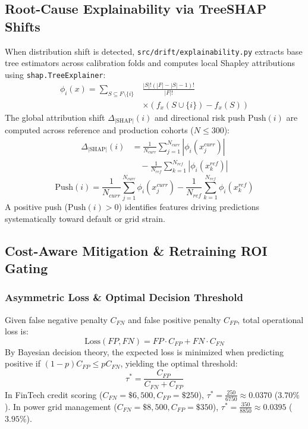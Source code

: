\documentclass[conference]{IEEEtran}
\begin{document}
\subsection{Root-Cause Explainability via TreeSHAP Shifts}
When distribution shift is detected, \texttt{src/drift/explainability.py} extracts base tree estimators across calibration folds and computes local Shapley attributions using \texttt{shap.TreeExplainer}:
\begin{equation}
\begin{aligned}
\phi_i(x) = \sum_{S \subseteq F \setminus \{i\}} &\frac{|S|!(|F| - |S| - 1)!}{|F|!} \\
&\times \left( f_x(S \cup \{i\}) - f_x(S) \right)
\end{aligned}
\end{equation}
The global attribution shift $\Delta_{|\text{SHAP}|}(i)$ and directional risk push $\text{Push}(i)$ are computed across reference and production cohorts ($N \le 300$):
\begin{equation}
\begin{aligned}
\Delta_{|\text{SHAP}|}(i) &= \frac{1}{N_{curr}} \sum_{j=1}^{N_{curr}} |\phi_i(x_j^{curr})| \\
&\quad - \frac{1}{N_{ref}} \sum_{k=1}^{N_{ref}} |\phi_i(x_k^{ref})|
\end{aligned}
\end{equation}
\begin{equation}
\text{Push}(i) = \frac{1}{N_{curr}} \sum_{j=1}^{N_{curr}} \phi_i(x_j^{curr}) - \frac{1}{N_{ref}} \sum_{k=1}^{N_{ref}} \phi_i(x_k^{ref})
\end{equation}
A positive push ($\text{Push}(i) > 0$) identifies features driving predictions systematically toward default or grid strain.

\subsection{Cost-Aware Mitigation \& Retraining ROI Gating}

\subsubsection{Asymmetric Loss \& Optimal Decision Threshold}
Given false negative penalty $C_{FN}$ and false positive penalty $C_{FP}$, total operational loss is:
\begin{equation}
\text{Loss}(FP, FN) = FP \cdot C_{FP} + FN \cdot C_{FN}
\end{equation}
By Bayesian decision theory, the expected loss is minimized when predicting positive if $(1-p) C_{FP} \le p C_{FN}$, yielding the optimal threshold:
\begin{equation}
\tau^* = \frac{C_{FP}}{C_{FN} + C_{FP}}
\end{equation}
In FinTech credit scoring ($C_{FN}=\$6,500, C_{FP}=\$250$), $\tau^* = \frac{250}{6750} \approx 0.0370$ ($3.70\%$). In power grid management ($C_{FN}=\$8,500, C_{FP}=\$350$), $\tau^* = \frac{350}{8850} \approx 0.0395$ ($3.95\%$).
\end{document}
